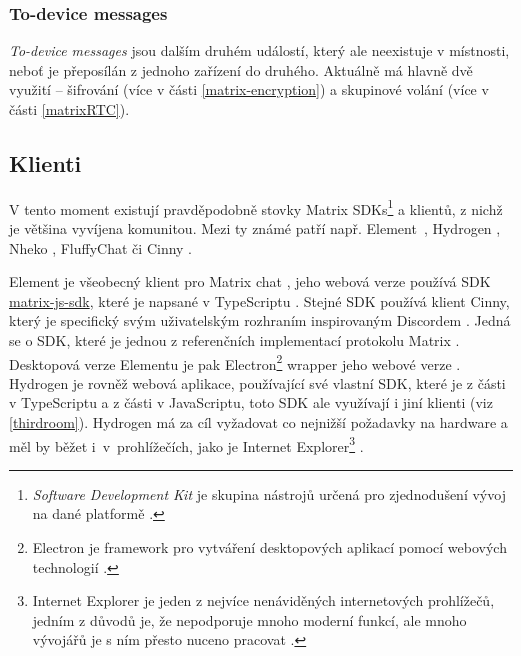 \subsubsection{To-device messages}

\textit{To-device messages} jsou dalším druhém událostí, který ale neexistuje v
místnosti, neboť je přeposílán z jednoho zařízení do druhého. Aktuálně má hlavně
dvě využití -- šifrování (více v části \ref{matrix-encryption}) a skupinové
volání (více v části \ref{matrixRTC}).

\subsection{Klienti}

V tento moment existují pravděpodobně stovky Matrix SDKs\footnote{
    \textit{Software Development Kit} je skupina nástrojů určená pro zjednodušení
    vývoj na dané platformě \cite{RedHat-WhatIsAnSDK}.
} a klientů, z nichž je většina vyvíjena komunitou. Mezi ty známé patří např.
Element~\cite{Element-Homepage}, Hydrogen \cite{GitHub-Hydrogen}, Nheko
\cite{GitHub-Nheko}, FluffyChat \cite{FluffyChat-Homepage} či Cinny
\cite{Cinny-Homepage}.

Element je všeobecný klient pro Matrix chat \cite{Element-Homepage}, jeho webová
verze používá SDK
\href{https://github.com/matrix-org/matrix-js-sdk/}{matrix-js-sdk}, které je
napsané v TypeScriptu \cite{GitHub-MatrixJSSDK}. Stejné SDK používá klient
Cinny, který je specifický svým uživatelským rozhraním inspirovaným Discordem
\cite{Cinny-Homepage,GitHub-Cinny}. Jedná se o SDK, které je jednou z
referenčních implementací protokolu Matrix \cite{GitHub-MatrixJSSDK}. Desktopová
verze Elementu je pak Electron\footnote{
    Electron je framework pro vytváření desktopových aplikací pomocí webových
    technologií \cite{ElectronJS-Homepage}.
} wrapper jeho webové verze \cite{GitHub-ElementDesktop}. Hydrogen je rovněž
webová aplikace, používající své vlastní SDK, které je z části v TypeScriptu a
z části v JavaScriptu, toto SDK ale využívají i jiní klienti (viz
\ref{thirdroom}). Hydrogen má za cíl vyžadovat co nejnižší požadavky na hardware a
měl by běžet i~v~prohlížečích, jako je Internet Explorer\footnote{
    Internet Explorer je jeden z nejvíce nenáviděných internetových prohlížečů,
    jedním z důvodů je, že nepodporuje mnoho moderní funkcí, ale mnoho vývojářů je s
    ním přesto nuceno pracovat
    \cite{ZealousSites-WhyDoWebDevelopersHateInternetExplorer}.
} \cite{GitHub-Hydrogen}.

